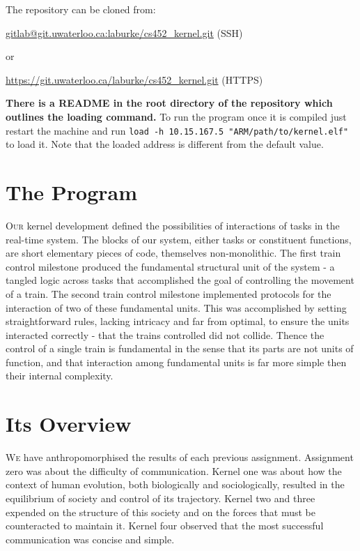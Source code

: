 \documentclass{amsart} \usepackage{amsmath} \usepackage{upgreek}
\begin{document}
\noindent The repository can be cloned from:

\url{gitlab@git.uwaterloo.ca:laburke/cs452_kernel.git} (SSH)

or

\url{https://git.uwaterloo.ca/laburke/cs452_kernel.git} (HTTPS)

\textbf{There is a README in the root directory of the repository which outlines
the loading command.} To run the program once it is compiled just restart the
machine and run \texttt{load -h 10.15.167.5
"ARM/path/to/kernel.elf"} to load it. Note that the loaded address is different
from the default value.

\section*{The Program}

\textsc{Our} kernel development defined the possibilities of interactions of tasks in the real-time system. The blocks of our system, either tasks or constituent functions, are short elementary pieces of code, themselves non-monolithic. The first train control milestone produced the fundamental structural unit of the system - a tangled logic across tasks that accomplished the goal of controlling the movement of a train. The second train control milestone implemented protocols for the interaction of two of these fundamental units. This was accomplished by setting straightforward rules, lacking intricacy and far from optimal, to ensure the units interacted correctly - that the trains controlled did not collide. Thence the control of a single train is fundamental in the sense that its parts are not units of function, and that interaction among fundamental units is far more simple then their internal complexity.

\section*{Its Overview}

\textsc{We} have anthropomorphised the results of each previous assignment. Assignment zero was about the difficulty of communication. Kernel one was about how the context of human evolution, both biologically and sociologically, resulted in the equilibrium of society and control of its trajectory. Kernel two and three expended on the structure of this society and on the forces that must be counteracted to maintain it. Kernel four observed that the most successful communication was concise and simple.
\end{document}
